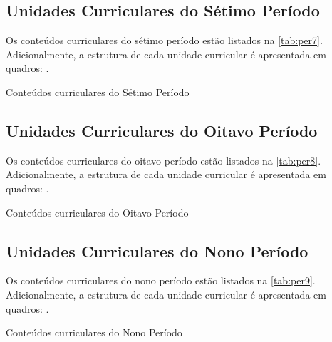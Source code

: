 \clearpage

\subsection{Unidades Curriculares do Sétimo Período}

Os conteúdos curriculares do sétimo período estão listados na \autoref{tab:per7}. Adicionalmente, a estrutura de cada unidade curricular é apresentada em quadros: .

\begin{table}[!htb]
	\centering\footnotesize
	\caption{Conteúdos curriculares do Sétimo Período}
	\label{tab:per7}
\end{table}

\clearpage

\subsection{Unidades Curriculares do Oitavo Período}

Os conteúdos curriculares do oitavo período estão listados na \autoref{tab:per8}. Adicionalmente, a estrutura de cada unidade curricular é apresentada em quadros: .

\begin{table}[!htb]
	\centering\footnotesize
	\caption{Conteúdos curriculares do Oitavo Período}
	\label{tab:per8}
\end{table}

\clearpage

\subsection{Unidades Curriculares do Nono Período}

Os conteúdos curriculares do nono período estão listados na \autoref{tab:per9}. Adicionalmente, a estrutura de cada unidade curricular é apresentada em quadros: .

\begin{table}[!htb]
	\centering\footnotesize
	\caption{Conteúdos curriculares do Nono Período}
	\label{tab:per9}
\end{table}

